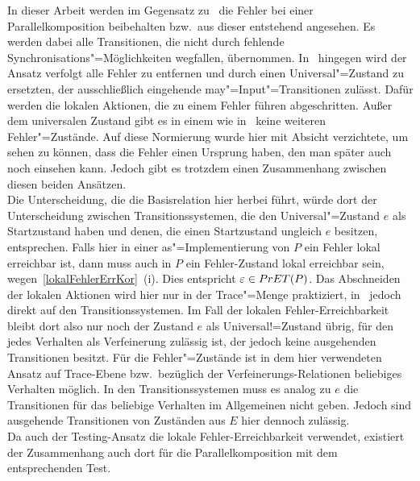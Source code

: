 In dieser Arbeit werden im Gegensatz zu~\cite{Vogler2016MIA3} die Fehler bei
einer Parallelkomposition beibehalten bzw.\ aus dieser entstehend angesehen. Es
werden dabei alle Transitionen, die nicht durch fehlende
Synchronisations"=Möglichkeiten wegfallen, übernommen. In~\cite{Vogler2016MIA3}
hingegen wird der Ansatz verfolgt alle Fehler zu entfernen und durch einen
Universal"=Zustand zu ersetzten, der ausschließlich eingehende
may"=Input"=Transitionen zulässt. Dafür werden die lokalen Aktionen, die zu
einem Fehler führen abgeschritten. Außer dem universalen Zustand gibt es in
einem \MIA{} wie in~\cite{Vogler2016MIA3} keine weiteren Fehler"=Zustände. Auf
diese Normierung wurde hier mit Absicht verzichtete, um sehen zu können, dass
die Fehler einen Ursprung haben, den man später auch noch einsehen kann. Jedoch
gibt es trotzdem einen Zusammenhang zwischen diesen beiden Ansätzen.\\
Die Unterscheidung, die die Basisrelation \EBRel{} hier herbei führt, würde
dort der Unterscheidung zwischen Transitionssystemen, die den
Universal"=Zustand $e$ als Startzustand haben und denen, die einen Startzustand
ungleich $e$ besitzen, entsprechen. Falls hier in einer as"=Implementierung von
$P$ ein Fehler lokal erreichbar ist, dann muss auch in $P$ ein Fehler-Zustand
lokal erreichbar sein, wegen~\ref{lokalFehlerErrKor}~(i). Dies entspricht
$\varepsilon \in PrET (P)$. Das Abschneiden der lokalen Aktionen wird hier nur
in der Trace"=Menge praktiziert, in~\cite{Vogler2016MIA3} jedoch direkt auf den
Transitionssystemen. Im Fall der lokalen Fehler-Erreichbarkeit bleibt dort also
nur noch der Zustand $e$ als Universal!=Zustand übrig, für den jedes Verhalten
als Verfeinerung zulässig ist, der jedoch keine ausgehenden Transitionen
besitzt. Für die Fehler"=Zustände ist in dem hier verwendeten Ansatz auf
Trace-Ebene bzw.\ bezüglich der Verfeinerungs-Relationen beliebiges Verhalten
möglich. In den Transitionssystemen muss es analog zu $e$ die Transitionen für
das beliebige Verhalten im Allgemeinen nicht geben. Jedoch sind ausgehende
Transitionen von Zuständen aus $E$ hier dennoch zulässig.\\
Da auch der Testing-Ansatz die lokale Fehler-Erreichbarkeit verwendet,
existiert der Zusammenhang auch dort für die Parallelkomposition mit dem
entsprechenden Test.

